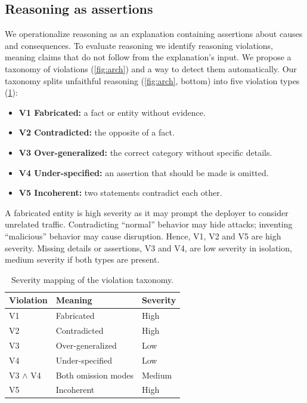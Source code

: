 \documentclass[conference]{IEEEtran}
\begin{document}
\subsection{Reasoning as assertions}
We operationalize reasoning as an explanation containing assertions about causes and consequences. To evaluate reasoning we identify reasoning violations, meaning claims that do not follow from the explanation's input. We propose a taxonomy of violations (\cref{fig:arch}) and a way to detect them automatically. Our taxonomy splits unfaithful reasoning (\cref{fig:arch}, bottom) into five violation types (\cref{tab:severity}):
\begin{itemize}
  \item \textbf{V1 Fabricated:} a fact or entity without evidence.
  \item \textbf{V2 Contradicted:} the opposite of a fact.
  \item \textbf{V3 Over-generalized:} the correct category without specific details.
  \item \textbf{V4 Under-specified:} an assertion that should be made is omitted.
  \item \textbf{V5 Incoherent:} two statements contradict each other.
\end{itemize}

A fabricated entity is high severity as it may prompt the deployer to consider unrelated traffic. Contradicting ``normal'' behavior may hide attacks; inventing ``malicious'' behavior may cause disruption. Hence, V1, V2 and V5 are high severity. Missing details or assertions, V3 and V4, are low severity in isolation, medium severity if both types are present.

\begin{table}[t]
\centering
\caption{Severity mapping of the violation taxonomy.}
\label{tab:severity}
\begin{tabular}{@{}lll@{}}
\toprule
Violation & Meaning & Severity \\
\midrule
V1 & Fabricated       & High \\
V2 & Contradicted     & High \\
V3 & Over-generalized & Low \\
V4 & Under-specified  & Low \\
V3 $\wedge$ V4 & Both omission modes & Medium \\
V5 & Incoherent       & High \\
\bottomrule
\end{tabular}
\end{table}
\end{document}
